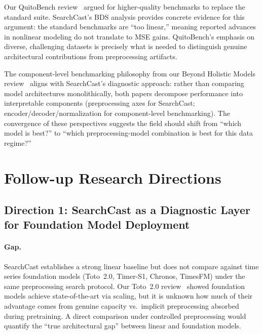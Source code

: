 \documentclass[11pt,a4paper]{article}
\begin{document}
Our QuitoBench review~\cite{quitobench2026} argued for higher-quality benchmarks to replace the standard suite. SearchCast's BDS analysis provides concrete evidence for this argument: the standard benchmarks are ``too linear,'' meaning reported advances in nonlinear modeling do not translate to MSE gains. QuitoBench's emphasis on diverse, challenging datasets is precisely what is needed to distinguish genuine architectural contributions from preprocessing artifacts.

The component-level benchmarking philosophy from our Beyond Holistic Models review~\cite{wang2026component} aligns with SearchCast's diagnostic approach: rather than comparing model architectures monolithically, both papers decompose performance into interpretable components (preprocessing axes for SearchCast; encoder/decoder/normalization for component-level benchmarking). The convergence of these perspectives suggests the field should shift from ``which model is best?'' to ``which preprocessing-model combination is best for this data regime?''

\section{Follow-up Research Directions}

\subsection{Direction 1: SearchCast as a Diagnostic Layer for Foundation Model Deployment}

\paragraph{Gap.} SearchCast establishes a strong linear baseline but does not compare against time series foundation models (Toto~2.0, Timer-S1, Chronos, TimesFM) under the same preprocessing search protocol. Our Toto~2.0 review~\cite{woo2026toto} showed foundation models achieve state-of-the-art via scaling, but it is unknown how much of their advantage comes from genuine capacity vs.\ implicit preprocessing absorbed during pretraining. A direct comparison under controlled preprocessing would quantify the ``true architectural gap'' between linear and foundation models.
\end{document}
